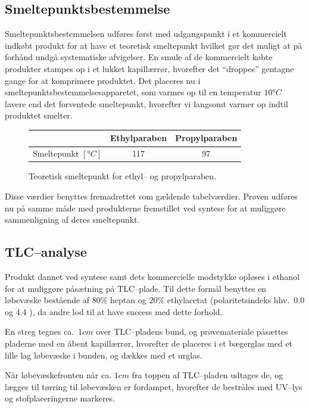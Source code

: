     \subsection{Smeltepunktsbestemmelse}
    Smeltepunktsbestemmelsen udføres først med udgangspunkt i et kommercielt indkøbt produkt for at have et teoretisk smeltepunkt hvilket gør det muligt at på forhånd undgå systematiske afvigelser. En smule af de kommercielt købte produkter stampes op i et lukket kapillærrør, hvorefter det ``droppes'' gentagne gange for at komprimere produktet. Det placeres nu i smeltepunktsbestemmelsesapparetet, som varmes op til en temperatur $10\si{\degree C}$ lavere end det forventede smeltepunkt, hvorefter vi langsomt varmer op indtil produktet smelter.
    \begin{figure}[H]\centering
        \caption{Teoretisk smeltepunkt for ethyl-- og propylparaben.}
        \begin{tabular}{ccc}
            \toprule
            & Ethylparaben & Propylparaben \\
            \midrule
            Smeltepunkt $\left[\si{\degree C}\right]$ & 117 & 97 \\
            \bottomrule
        \end{tabular}
    \end{figure}
    Disse værdier benyttes fremadrettet som gældende tabelværdier. Prøven udføres nu på samme måde med produkterne fremstillet ved syntese for at muliggøre sammenligning af deres smeltepunkt.

    \subsection{TLC--analyse}
    Produkt dannet ved syntese samt dets kommercielle modstykke opløses i ethanol for at muliggøre påsætning på TLC--plade. Til dette formål benyttes en løbevæske bestående af $80\%$ heptan og $20\%$ ethylacetat (polaritetsindeks hhv.\ 0.0 og 4.4 \parencite{Phen}), da andre lod til at have success med dette forhold.

    En streg tegnes ca.\ $1\si{cm}$ over TLC--pladens bund, og prøvemateriale påsættes pladerne med en åbent kapillærrør, hvorefter de placeres i et bægerglas med et lille lag løbevæske i bunden, og dækkes med et urglas.

    Når løbevæskefronten når ca. $1\si{cm}$ fra toppen af TLC--pladen udtages de, og lægges til tørring til løbevæsken er fordampet, hvorefter de bestråles med UV--lys og stofplaceringerne markeres.


